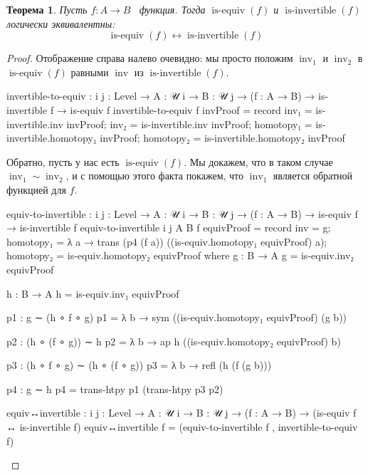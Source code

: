\documentclass{article}[12pt]
\newtheorem{theorem}{Теорема}
\newcommand{\dash}{\textemdash\ }
\newcommand{\op}{\operatorname}
\begin{document}
\begin{theorem}
    \label{EquivAndInverseAreSameTheorem}
    Пусть $f : A \rightarrow B$ \dash функция. Тогда $\op{is-equiv}(f)$ и $\op{is-invertible}(f)$
    логически эквивалентны:
    $$\op{is-equiv}(f) \leftrightarrow \op{is-invertible}(f)$$
\end{theorem}
\begin{proof}
Отображение справа налево очевидно: мы просто положим $\op{inv}_1$ и $\op{inv}_2$ 
в $\op{is-equiv}(f)$ равными $\op{inv}$ из $\op{is-invertible}(f)$.
\begin{code}
invertible-to-equiv : {i j : Level} → {A : 𝒰 i} → {B : 𝒰 j}
                      → (f : A → B) → is-invertible f
                      → is-equiv f
invertible-to-equiv f invProof = 
    record {inv₁ = is-invertible.inv invProof;
            inv₂ = is-invertible.inv invProof;
            homotopy₁ = is-invertible.homotopy₁ invProof;
            homotopy₂ = is-invertible.homotopy₂ invProof}
\end{code}

Обратно, пусть у нас есть $\op{is-equiv}(f)$. Мы докажем, что в таком случае $\op{inv}_1 \sim \op{inv}_2$, и
с помощью этого факта покажем, что $\op{inv}_1$ является обратной функцией для $f$.
\begin{code}
equiv-to-invertible : {i j : Level} → {A : 𝒰 i} → {B : 𝒰 j}
                      → (f : A → B) → is-equiv f
                      → is-invertible f
equiv-to-invertible {i} {j} {A} {B} f equivProof = 
    record {inv = g;
            homotopy₁ = λ a → trans (p4 (f a)) ((is-equiv.homotopy₁ equivProof) a);
            homotopy₂ = is-equiv.homotopy₂ equivProof}
    where
        g : B → A
        g = is-equiv.inv₂ equivProof

        h : B → A
        h = is-equiv.inv₁ equivProof

        p1 : g ∼ (h ∘ f ∘ g)
        p1 = λ b → sym ((is-equiv.homotopy₁ equivProof) (g b))

        p2 : (h ∘ (f ∘ g)) ∼ h
        p2 = λ b → ap h ((is-equiv.homotopy₂ equivProof) b)

        p3 : (h ∘ f ∘ g) ∼ (h ∘ (f ∘ g))
        p3 = λ b → refl (h (f (g b)))

        p4 : g ∼ h
        p4 = trans-htpy p1 (trans-htpy p3 p2)

equiv↔invertible : {i j : Level} → {A : 𝒰 i} → {B : 𝒰 j}
                   → (f : A → B)
                   → (is-equiv f ↔ is-invertible f)
equiv↔invertible f = (equiv-to-invertible f , invertible-to-equiv f)
\end{code}
\end{proof}
\end{document}
